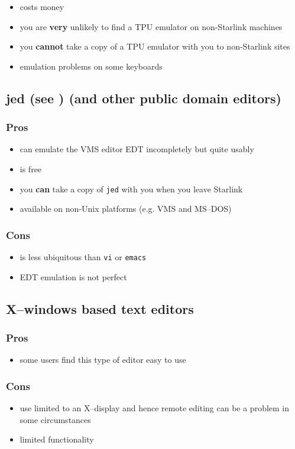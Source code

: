 \documentclass[twoside,11pt,nolof]{starlink}
\begin{document}
\begin{itemize}
\item costs money
\item you are \textbf{very} unlikely to find a TPU emulator on non-Starlink machines
\item you \textbf{cannot} take a copy of a TPU emulator with you to non-Starlink sites
\item emulation problems on some keyboards
\end{itemize}

\subsection{jed (see
) (and other public domain editors)}

\subsubsection*{Pros}

\begin{itemize}
\item can emulate the VMS editor EDT incompletely but quite usably
\item is free
\item you \textbf{can} take a copy of \verb|jed| with you when you leave Starlink
\item available on non-Unix platforms (e.g. VMS and MS--DOS)
\end{itemize}

\subsubsection*{Cons}
\begin{itemize}
\item is less ubiquitous than \verb|vi| or \verb|emacs|
\item EDT emulation is not perfect
\end{itemize}


\subsection{X--windows based text editors}

\subsubsection*{Pros}

\begin{itemize}
\item some users find this type of editor easy to use
\end{itemize}

\subsubsection*{Cons}
\begin{itemize}
\item use limited to an X--display and hence remote editing can
be a problem in some circumstances
\item limited functionality
\end{itemize}
\end{document}
